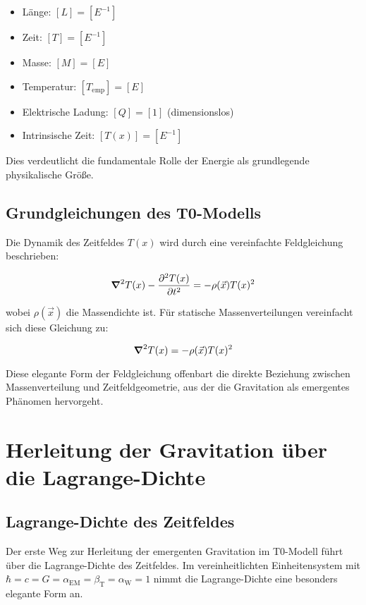 \documentclass[12pt,a4paper]{article}
\newcommand{\Tfield}{T(x)}
\newcommand{\betaT}{\beta_{\text{T}}}
\newcommand{\alphaEM}{\alpha_{\text{EM}}}
\newcommand{\alphaW}{\alpha_{\text{W}}}
\newcommand{\vecx}{\vec{x}}
\begin{document}
	\begin{itemize}
		\item Länge: $[L] = [E^{-1}]$
		\item Zeit: $[T] = [E^{-1}]$
		\item Masse: $[M] = [E]$
		\item Temperatur: $[T_{\text{emp}}] = [E]$
		\item Elektrische Ladung: $[Q] = [1]$ (dimensionslos)
		\item Intrinsische Zeit: $[\Tfield] = [E^{-1}]$
	\end{itemize}
	
	Dies verdeutlicht die fundamentale Rolle der Energie als grundlegende physikalische Größe.
	
	\subsection{Grundgleichungen des T0-Modells}
	Die Dynamik des Zeitfeldes \(\Tfield\) wird durch eine vereinfachte Feldgleichung beschrieben:
	
	\begin{equation}
		\grad^2 \Tfield - \frac{\partial^2 \Tfield}{\partial t^2} = -\rho(\vecx) \Tfield^2
	\end{equation}
	
	wobei \(\rho(\vecx)\) die Massendichte ist. Für statische Massenverteilungen vereinfacht sich diese Gleichung zu:
	
	\begin{equation}
		\grad^2 \Tfield = -\rho(\vecx) \Tfield^2
	\end{equation}
	
	Diese elegante Form der Feldgleichung offenbart die direkte Beziehung zwischen Massenverteilung und Zeitfeldgeometrie, aus der die Gravitation als emergentes Phänomen hervorgeht.
	
	\section{Herleitung der Gravitation über die Lagrange-Dichte}
	
	\subsection{Lagrange-Dichte des Zeitfeldes}
	Der erste Weg zur Herleitung der emergenten Gravitation im T0-Modell führt über die Lagrange-Dichte des Zeitfeldes. Im vereinheitlichten Einheitensystem mit \(\hbar = c = G = \alphaEM = \betaT = \alphaW = 1\) nimmt die Lagrange-Dichte eine besonders elegante Form an.
	
\end{document}
